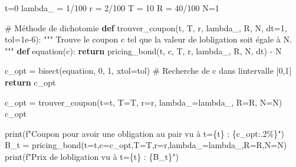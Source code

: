 \documentclass[
  letterpaper,
  DIV=11,
  numbers=noendperiod]{scrartcl}
\newenvironment{Shaded}{\begin{snugshade}}{\end{snugshade}}
\newcommand{\BuiltInTok}[1]{\textcolor[rgb]{0.00,0.23,0.31}{#1}}
\newcommand{\CommentTok}[1]{\textcolor[rgb]{0.37,0.37,0.37}{#1}}
\newcommand{\ControlFlowTok}[1]{\textcolor[rgb]{0.00,0.23,0.31}{\textbf{#1}}}
\newcommand{\DecValTok}[1]{\textcolor[rgb]{0.68,0.00,0.00}{#1}}
\newcommand{\FloatTok}[1]{\textcolor[rgb]{0.68,0.00,0.00}{#1}}
\newcommand{\KeywordTok}[1]{\textcolor[rgb]{0.00,0.23,0.31}{\textbf{#1}}}
\newcommand{\NormalTok}[1]{\textcolor[rgb]{0.00,0.23,0.31}{#1}}
\newcommand{\OperatorTok}[1]{\textcolor[rgb]{0.37,0.37,0.37}{#1}}
\newcommand{\SpecialCharTok}[1]{\textcolor[rgb]{0.37,0.37,0.37}{#1}}
\newcommand{\SpecialStringTok}[1]{\textcolor[rgb]{0.13,0.47,0.30}{#1}}
\begin{document}
\begin{Shaded}
\begin{Highlighting}[]
\NormalTok{t}\OperatorTok{=}\DecValTok{0}
\NormalTok{lambda\_ }\OperatorTok{=} \DecValTok{1}\OperatorTok{/}\DecValTok{100}
\NormalTok{r }\OperatorTok{=} \DecValTok{2}\OperatorTok{/}\DecValTok{100}
\NormalTok{T }\OperatorTok{=} \DecValTok{10}
\NormalTok{R }\OperatorTok{=} \DecValTok{40}\OperatorTok{/}\DecValTok{100}
\NormalTok{N}\OperatorTok{=}\DecValTok{1}

\CommentTok{\# Méthode de dichotomie}
\KeywordTok{def}\NormalTok{ trouver\_coupon(t, T, r, lambda\_, R, N, dt}\OperatorTok{=}\DecValTok{1}\NormalTok{, tol}\OperatorTok{=}\FloatTok{1e{-}6}\NormalTok{):}
    \CommentTok{"""}
\CommentTok{    Trouve le coupon c tel que la valeur de l\textquotesingle{}obligation soit égale à N.}
\CommentTok{    """}
    \KeywordTok{def}\NormalTok{ equation(c):}
        \ControlFlowTok{return}\NormalTok{ pricing\_bond(t, c, T, r, lambda\_, R, N, dt) }\OperatorTok{{-}}\NormalTok{ N}
    
\NormalTok{    c\_opt }\OperatorTok{=}\NormalTok{ bisect(equation, }\DecValTok{0}\NormalTok{, }\DecValTok{1}\NormalTok{, xtol}\OperatorTok{=}\NormalTok{tol)  }\CommentTok{\# Recherche de c dans l\textquotesingle{}intervalle [0,1]}
    \ControlFlowTok{return}\NormalTok{ c\_opt}

\NormalTok{c\_opt }\OperatorTok{=}\NormalTok{ trouver\_coupon(t}\OperatorTok{=}\NormalTok{t, T}\OperatorTok{=}\NormalTok{T, r}\OperatorTok{=}\NormalTok{r, lambda\_}\OperatorTok{=}\NormalTok{lambda\_, R}\OperatorTok{=}\NormalTok{R, N}\OperatorTok{=}\NormalTok{N)}
\NormalTok{c\_opt}

\BuiltInTok{print}\NormalTok{(}\SpecialStringTok{f"Coupon pour avoir une obligation au pair vu à t=}\SpecialCharTok{\{}\NormalTok{t}\SpecialCharTok{\}}\SpecialStringTok{ : }\SpecialCharTok{\{}\NormalTok{c\_opt}\SpecialCharTok{:.2\%\}}\SpecialStringTok{"}\NormalTok{)}
\NormalTok{B\_t }\OperatorTok{=}\NormalTok{ pricing\_bond(t}\OperatorTok{=}\NormalTok{t,c}\OperatorTok{=}\NormalTok{c\_opt,T}\OperatorTok{=}\NormalTok{T,r}\OperatorTok{=}\NormalTok{r,lambda\_}\OperatorTok{=}\NormalTok{lambda\_,R}\OperatorTok{=}\NormalTok{R,N}\OperatorTok{=}\NormalTok{N)}
\BuiltInTok{print}\NormalTok{(}\SpecialStringTok{f"Prix de l\textquotesingle{}obligation vu à t=}\SpecialCharTok{\{}\NormalTok{t}\SpecialCharTok{\}}\SpecialStringTok{ : }\SpecialCharTok{\{}\NormalTok{B\_t}\SpecialCharTok{\}}\SpecialStringTok{"}\NormalTok{)}
\end{Highlighting}
\end{Shaded}
\end{document}
